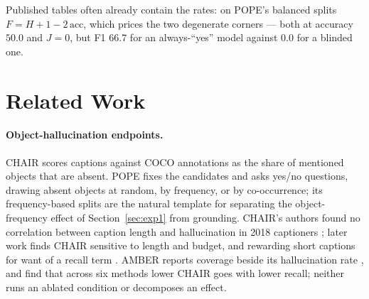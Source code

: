 \documentclass{article} %
\begin{document}
Published tables often already contain the rates: on POPE's balanced splits $F = H + 1 - 2\,\mathrm{acc}$,
which prices the two degenerate corners --- both at accuracy $50.0$ and $J = 0$, but F1 $66.7$ for an
always-``yes'' model against $0.0$ for a blinded one.

\section{Related Work}
\label{sec:related}

\paragraph{Object-hallucination endpoints.} CHAIR \citep{chair} scores captions against COCO annotations
\citep{coco} as the share of mentioned objects that are absent. POPE \citep{pope} fixes the candidates
and asks yes/no questions, drawing absent objects at random, by frequency, or by co-occurrence;
its frequency-based splits are the natural template for separating the object-frequency effect of
Section~\ref{sec:exp1} from grounding. CHAIR's authors found no correlation between caption length and
hallucination in 2018 captioners \citep{chair}; later work finds CHAIR sensitive to length and budget,
and rewarding short captions for want of a recall term \citep{pope, regionaware, throne}. AMBER reports
coverage beside its hallucination rate \citep{amber}, and \citet{safefaith} find that across six methods
lower CHAIR goes with lower recall; neither runs an ablated condition or decomposes an effect.
\end{document}
